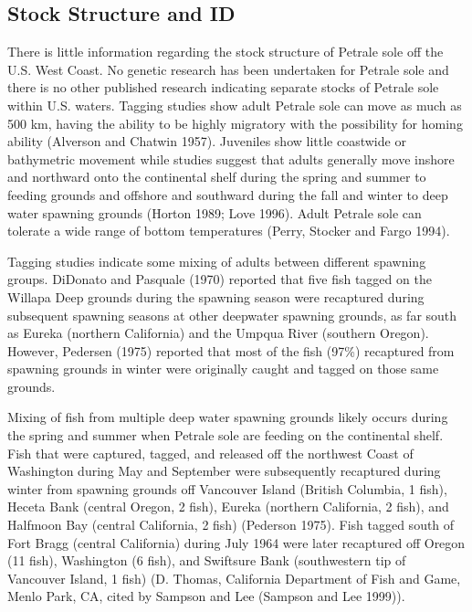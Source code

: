 \documentclass[
]{scrartcl}
\begin{document}
\subsection{Stock Structure and ID}\label{stock-structure-and-id}

There is little information regarding the stock structure of Petrale
sole off the U.S. West Coast. No genetic research has been undertaken
for Petrale sole and there is no other published research indicating
separate stocks of Petrale sole within U.S. waters. Tagging studies show
adult Petrale sole can move as much as 500 km, having the ability to be
highly migratory with the possibility for homing ability (Alverson and
Chatwin 1957). Juveniles show little coastwide or bathymetric movement
while studies suggest that adults generally move inshore and northward
onto the continental shelf during the spring and summer to feeding
grounds and offshore and southward during the fall and winter to deep
water spawning grounds (Horton 1989; Love 1996). Adult Petrale sole can
tolerate a wide range of bottom temperatures (Perry, Stocker and Fargo
1994).

Tagging studies indicate some mixing of adults between different
spawning groups. DiDonato and Pasquale (1970) reported that five fish
tagged on the Willapa Deep grounds during the spawning season were
recaptured during subsequent spawning seasons at other deepwater
spawning grounds, as far south as Eureka (northern California) and the
Umpqua River (southern Oregon). However, Pedersen (1975) reported that
most of the fish (97\%) recaptured from spawning grounds in winter were
originally caught and tagged on those same grounds.

Mixing of fish from multiple deep water spawning grounds likely occurs
during the spring and summer when Petrale sole are feeding on the
continental shelf. Fish that were captured, tagged, and released off the
northwest Coast of Washington during May and September were subsequently
recaptured during winter from spawning grounds off Vancouver Island
(British Columbia, 1 fish), Heceta Bank (central Oregon, 2 fish), Eureka
(northern California, 2 fish), and Halfmoon Bay (central California, 2
fish) (Pederson 1975). Fish tagged south of Fort Bragg (central
California) during July 1964 were later recaptured off Oregon (11 fish),
Washington (6 fish), and Swiftsure Bank (southwestern tip of Vancouver
Island, 1 fish) (D. Thomas, California Department of Fish and Game,
Menlo Park, CA, cited by Sampson and Lee (Sampson and Lee 1999)).
\end{document}
